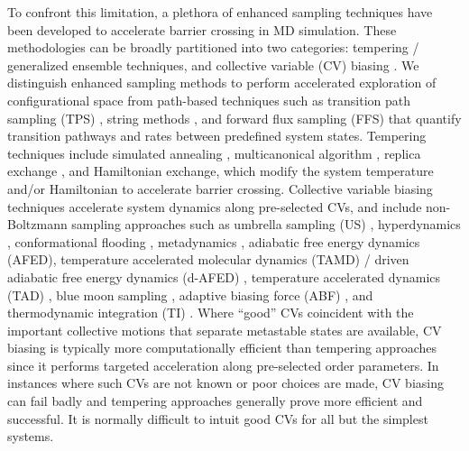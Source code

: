 \documentclass[12pt]{article}
\newcommand*{\groen}[1]{#1}
\newcommand*{\blauwr}[1]{#1}
\begin{document}
To confront this limitation, a plethora of enhanced sampling techniques have been developed to accelerate barrier crossing in MD simulation\cite{rohrdanz2013discovering,abrams2013enhanced}. These methodologies can be broadly partitioned into two categories: tempering / generalized ensemble techniques, and collective variable (\groen{CV}) biasing \cite{abrams2013enhanced}. We distinguish enhanced sampling methods to perform accelerated exploration of configurational space from path-based techniques such as transition path sampling (\groen{TPS}) \cite{dellago1998transition,bolhuis2002transition,rogal2008multiple,moroni2004rate,van2003novel}, string methods \cite{weinan2002string,weinan2005finite,jonsson1998nudged,sheppard2008optimization}, and forward flux sampling (\groen{FFS}) \cite{borrero2007reaction,allen2009forward} that quantify transition pathways and rates between predefined system states. Tempering techniques include simulated annealing \cite{brooks1995optimization}, multicanonical algorithm \cite{berg1992multicanonical}, replica exchange \cite{hansmann1997parallel,sugita1999replica}, and Hamiltonian exchange\cite{sugita2000replica,mitsutake2001generalized,fukunishi2002hamiltonian,okamoto2004generalized,liu2006hydrophobic}, which modify the system temperature and/or Hamiltonian to accelerate barrier crossing\cite{abrams2013enhanced}. Collective variable biasing techniques accelerate system dynamics along pre-selected CVs\cite{abrams2013enhanced,rohrdanz2013discovering}, and include non-Boltzmann sampling approaches such as umbrella sampling (\groen{US}) \cite{torrie1977nonphysical}, hyperdynamics \cite{voter1997hyperdynamics}, conformational flooding \cite{grubmuller1995predicting}, metadynamics \cite{laio2002escaping,huber1994local,barducci2008well}, adiabatic free energy dynamics (\groen{AFED})\cite{rosso2002use}, temperature accelerated molecular dynamics (\groen{TAMD}) \cite{maragliano2006temperature} / driven adiabatic free energy dynamics (\groen{d-AFED}) \cite{abrams2008efficient}, temperature accelerated dynamics (\groen{TAD}) \cite{so2000temperature}, blue moon sampling \cite{den1998calculation,carter1989constrained,ciccotti2004blue}, adaptive biasing force (\groen{ABF}) \cite{darve2008adaptive}, and thermodynamic integration (\groen{TI}) \cite{kirkwood1935statistical,straatsma1988free}. \blauwr{Where ``good'' CVs coincident with the important collective motions that separate metastable states are available, CV biasing is typically more computationally efficient than tempering approaches since it performs targeted acceleration along pre-selected order parameters\cite{abrams2013enhanced,wang2017nonlinear}. In instances where such CVs are not known or poor choices are made, CV biasing can fail badly and tempering approaches generally prove more efficient and successful. It is normally difficult to intuit good CVs for all but the simplest systems.}
\end{document}
